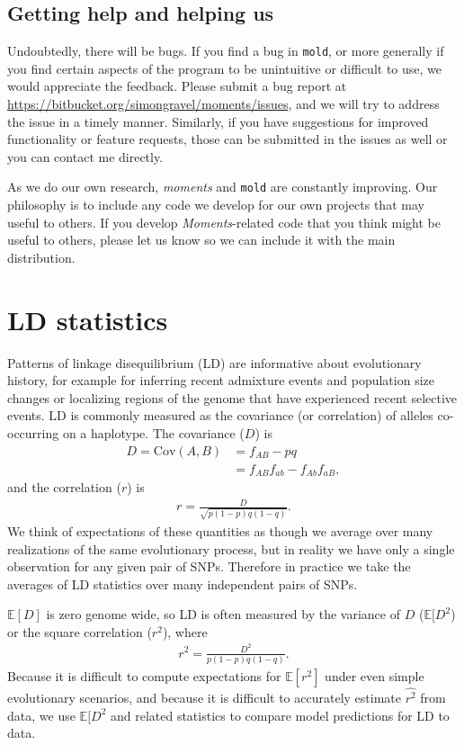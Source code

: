 \documentclass[11pt]{article}
\newcommand{\comment}[1]{{\color{blue}APR: #1}}
\newcommand{\mold}{\texttt{mold}\xspace}
\newcommand{\E}{\mathbb{E}}
\begin{document}

\subsection{Getting help and helping us}

Undoubtedly, there will be bugs.
If you find a bug in \mold, or more generally if you find certain aspects of the program to be unintuitive or difficult to use, we would appreciate the feedback.
Please submit a bug report at \url{https://bitbucket.org/simongravel/moments/issues}, and we will try to address the issue in a timely manner.
Similarly, if you have suggestions for improved functionality or feature requests, those can be submitted in the issues as well or you can contact me directly.

As we do our own research, \textit{moments} and \mold are constantly improving.
Our philosophy is to include any code we develop for our own projects that may useful to others.
If you develop \textit{Moments}-related code that you think might be useful to others, please let us know so we can include it with the main distribution.

\section{LD statistics}

Patterns of linkage disequilibrium (LD) are informative about evolutionary history, for example for inferring recent admixture events and population size changes or localizing regions of the genome that have experienced recent selective events.
LD is commonly measured as the covariance (or correlation) of alleles co-occurring on a haplotype.
The covariance ($D$) is
\begin{align*}
D = \text{Cov}(A,B) & = f_{AB} - pq \\ & = f_{AB}f_{ab} - f_{Ab}f_{aB},
\end{align*}
and the correlation ($r$) is
\begin{align*}
r = \frac{D}{\sqrt{p(1-p)q(1-q)}} .
\end{align*}
We think of expectations of these quantities as though we average over many realizations of the same evolutionary process, but in reality we have only a single observation for any given pair of SNPs.
Therefore in practice we take the averages of LD statistics over many independent pairs of SNPs.

$\E[D]$ is zero genome wide, so LD is often measured by the variance of $D$ ($\E[D^2$) or the square correlation ($r^2$), where
\begin{align*}
r^2 = \frac{D^2}{p(1-p)q(1-q)}.
\end{align*}
Because it is difficult to compute expectations for $\E[r^2]$ under even simple evolutionary scenarios, and because it is difficult to accurately estimate $\widehat{r^2}$ from data, we use $\E[D^2$ and related statistics to compare model predictions for LD to data.
\end{document}
